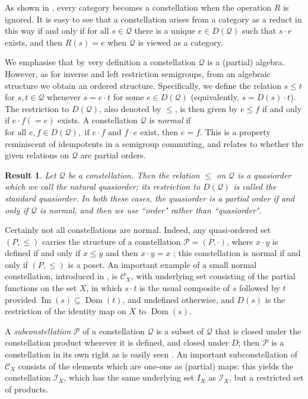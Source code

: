 \documentclass[12pt]{amsart}
\newtheorem{result}[thm]{Result}
\theoremstyle{definition}
\newcommand{\mc}{\mathcal}
\newcommand{\Pcon}{\mathcal P}
\newcommand{\Q}{\mathcal Q}
\newcommand{\C}{\mathcal C}
\newcommand{\I}{\mathcal I}
\DeclareMathOperator{\Dom}{Dom}
\DeclareMathOperator{\Img}{Im}
\begin{document}
{As shown in \cite{constgen}, every category becomes a constellation when the operation $R$ is ignored. It is easy to see that a constellation arises from a category as a reduct in this way if and only if for all $s\in \Q$ there is a unique $e\in D(\Q)$ such that $s\cdot e$ exists, and then $R(s)=e$ when $\Q$ is viewed as a category.

We emphasise that by very definition a constellation $\Q$ is a (partial) algebra. However, as for inverse and left restriction semigroups, from an algebraic structure we obtain an ordered structure. Specifically, we define the relation 
 $s\leq t$ for $s,t\in \Q$ whenever $s=e\cdot t$ for some $e\in D(\Q)$ (equivalently, $s=D(s)\cdot t$). The restriction to $D(\Q)$, also denoted by $\leq$,  is then given by $e\leq f$ if and only if $e\cdot f(=e)$ exists. 
A constellation $\Q$ is {\em normal} if $\mbox{for all }e,f\in D(\Q),\mbox{ if $e\cdot f$ and $f\cdot e$ exist, then }e=f$.   This is a property reminiscent of idempotents in a semigroup commuting, and relates to whether the given relations on $\Q$ are  partial orders.

\begin{result}  \label{parnormal} Let
$\Q$ be a constellation.  Then the relation $\leq$ on $\Q$ is a quasiorder which we call the {\em natural quasiorder}; its restriction to  $D(\Q)$ is called the {\em standard quasiorder}.   In both these cases, the quasiorder is a partial order if and only if $\Q$ is normal, and then we use ``order" rather than ``quasiorder".
\end{result}

Certainly not all constellations are normal. Indeed, any quasi-ordered set $(P,\leq)$  carries the structure of a constellation 
$\mathcal{P}=(P, \cdot)$, where  $x\cdot y$ is defined if and only if $x\leq y$ and then $x\cdot y=x$ \cite{constell}; this constellation is normal if and only if $(P,\leq)$ is a poset. An important example of a small normal constellation, introduced in \cite{constell}, is ${\mc C}_X$, with underlying set consisting of the partial functions on the set $X$, in which $s\cdot t$ is the usual composite of $s$ followed by $t$ provided $\Img(s)\subseteq \Dom(t)$, and undefined otherwise, and $D(s)$ is the restriction of the identity map on $X$ to $\Dom(s)$. 

A {\em subconstellation} $\Pcon$ of a constellation $\Q$ is a subset of $\Q$ that is closed under the constellation product wherever it is defined, and closed under $D$; then $\Pcon$ is  a constellation in its own right as is easily seen \cite{constgen}.
An important subconstellation of  $\C_X$ consists of the elements which are one-one as (partial) maps; this yields the  constellation $\I_X$, which has the same underlying set $I_X$ as $\mathscr{I}_X$, but a restricted set of products.

}
\end{document}
